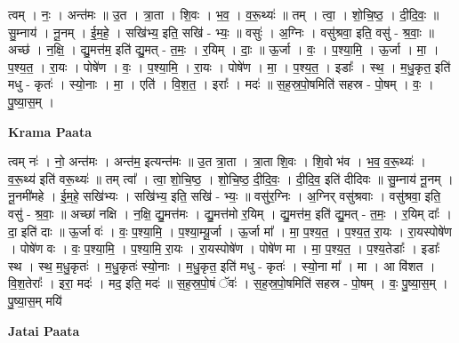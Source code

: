 \documentclass[17pt]{extarticle}
\begin{document}
त्वम् । नः॒ । अन्त॑मः ॥ उ॒त । त्रा॒ता । शि॒वः । भ॒व॒ । व॒रू॒थ्यः॑ ॥ तम् । त्वा॒ । शो॒चि॒ष्ठ॒ । दी॒दि॒वः॒ ॥ सु॒म्नाय॑ । नू॒नम् । ई॒म॒हे॒ । सखि॑भ्य॒ इति॒ सखि॑ - भ्यः॒ ॥ वसुः॑ । अ॒ग्निः । वसु॑श्रवा॒ इति॒ वसु॑ - श्र॒वाः॒ ॥ अच्छ॑ । न॒क्षि॒ । द्यु॒मत्त॑म॒ इति॑ द्यु॒मत् - त॒मः॒ । र॒यिम् । दाः॒ ॥ ऊ॒र्जा । वः॒ । प॒श्या॒मि॒ । ऊ॒र्जा । मा॒ । प॒श्य॒त॒ । रा॒यः । पोषे॑ण । वः॒ । प॒श्या॒मि॒ । रा॒यः । पोषे॑ण । मा॒ । प॒श्य॒त॒ । इडाः᳚ । स्थ॒ । म॒धु॒कृत॒ इति॑ मधु - कृतः॑ । स्यो॒नाः । मा॒ । एति॑ । वि॒श॒त॒ । इराः᳚ । मदः॑ ॥ स॒ह॒स्र॒पो॒षमिति॑ सहस्र - पो॒षम् । वः॒ । पु॒ष्या॒स॒म् ।  \newline


\textbf{Krama Paata} \newline

त्वम् नः॑ । नो॒ अन्त॑मः । अन्त॑म॒ इत्यन्त॑मः ॥ उ॒त त्रा॒ता । त्रा॒ता शि॒वः । शि॒वो भ॑व । भ॒व॒ व॒रू॒थ्यः॑ । व॒रू॒थ्य॑ इति॑ वरू॒थ्यः॑ ॥ तम् त्वा᳚ । त्वा॒ शो॒चि॒ष्ठ॒ । शो॒चि॒ष्ठ॒ दी॒दि॒वः॒ । दी॒दि॒व॒ इति॑ दीदिवः ॥ सु॒म्नाय॑ नू॒नम् । नू॒नमी॑महे । ई॒म॒हे॒ सखि॑भ्यः । सखि॑भ्य॒ इति॒ सखि॑ - भ्यः॒ ॥ वसु॑र॒ग्निः । अ॒ग्निर् वसु॑श्रवाः । वसु॑श्रवा॒ इति॒ वसु॑ - श्र॒वाः॒ ॥ अच्छा॑ नक्षि । न॒क्षि॒ द्यु॒मत्त॑मः । द्यु॒मत्त॑मो र॒यिम् । द्यु॒मत्त॑म॒ इति॑ द्यु॒मत् - त॒मः॒ । र॒यिम् दाः᳚ । दा॒ इति॑ दाः ॥ ऊ॒र्जा वः॑ । वः॒ प॒श्या॒मि॒ । प॒श्या॒म्यू॒र्जा । ऊ॒र्जा मा᳚ । मा॒ प॒श्य॒त॒ । प॒श्य॒त॒ रा॒यः । रा॒यस्पोषे॑ण । पोषे॑ण वः । वः॒ प॒श्या॒मि॒ । प॒श्या॒मि॒ रा॒यः । रा॒यस्पोषे॑ण । पोषे॑ण मा । मा॒ प॒श्य॒त॒ । प॒श्य॒तेडाः᳚ । इडाः᳚ स्थ । स्थ॒ म॒धु॒कृतः॑ । म॒धु॒कृतः॑ स्यो॒नाः । म॒धु॒कृत॒ इति॑ मधु - कृतः॑ । स्यो॒ना मा᳚ । मा । आ वि॑शत । वि॒श॒तेराः᳚ । इरा॒ मदः॑ । मद॒ इति॒ मदः॑ ॥ स॒ह॒स्र॒पो॒षं ॅवः॑ । स॒ह॒स्र॒पो॒षमिति॑ सहस्र - पो॒षम् । वः॒ पु॒ष्या॒स॒म् । पु॒ष्या॒स॒म् मयि॑ \newline

\textbf{Jatai Paata} \newline
\end{document}
